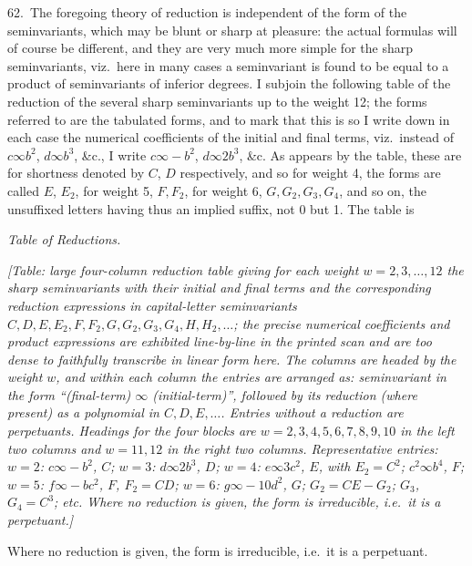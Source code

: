 \documentclass[11pt]{article}
\begin{document}
62.\ The foregoing theory of reduction is independent of the form of the seminvariants, which may be blunt or sharp at pleasure: the actual formulas will of course be different, and they are very much more simple for the sharp seminvariants, viz.\ here in many cases a seminvariant is found to be equal to a product of seminvariants of inferior degrees. I subjoin the following table of the reduction of the several sharp seminvariants up to the weight 12; the forms referred to are the tabulated forms, and to mark that this is so I write down in each case the numerical coefficients of the initial and final terms, viz.\ instead of $c \infty b^2$, $d \infty b^3$, \&c., I write $c \infty - b^2$, $d \infty 2b^3$, \&c. As appears by the table, these are for shortness denoted by $C$, $D$ respectively, and so for weight 4, the forms are called $E$, $E_2$, for weight 5, $F, F_2$, for weight 6, $G, G_2, G_3, G_4$, and so on, the unsuffixed letters having thus an implied suffix, not 0 but 1. The table is

\clearpage
\begin{center}
\textit{Table of Reductions.}
\end{center}

\textit{[Table: large four-column reduction table giving for each weight $w = 2, 3, \ldots, 12$ the sharp seminvariants with their initial and final terms and the corresponding reduction expressions in capital-letter seminvariants $C, D, E, E_2, F, F_2, G, G_2, G_3, G_4, H, H_2, \ldots$; the precise numerical coefficients and product expressions are exhibited line-by-line in the printed scan and are too dense to faithfully transcribe in linear form here. The columns are headed by the weight $w$, and within each column the entries are arranged as: seminvariant in the form ``(final-term) $\infty$ (initial-term)'', followed by its reduction (where present) as a polynomial in $C, D, E, \ldots$. Entries without a reduction are perpetuants. Headings for the four blocks are $w = 2, 3, 4, 5, 6, 7, 8, 9, 10$ in the left two columns and $w = 11, 12$ in the right two columns. Representative entries: $w=2$: $c \infty -b^2$, $C$; $w=3$: $d \infty 2b^3$, $D$; $w=4$: $e \infty 3c^2$, $E$, with $E_2 = C^2$; $c^2 \infty b^4$, $F$; $w=5$: $f \infty -bc^2$, $F$, $F_2 = CD$; $w=6$: $g \infty -10d^2$, $G$; $G_2 = CE - G_2$; $G_3$, $G_4 = C^3$; etc. Where no reduction is given, the form is irreducible, i.e.\ it is a perpetuant.]}

\medskip
Where no reduction is given, the form is irreducible, i.e.\ it is a perpetuant.
\end{document}

